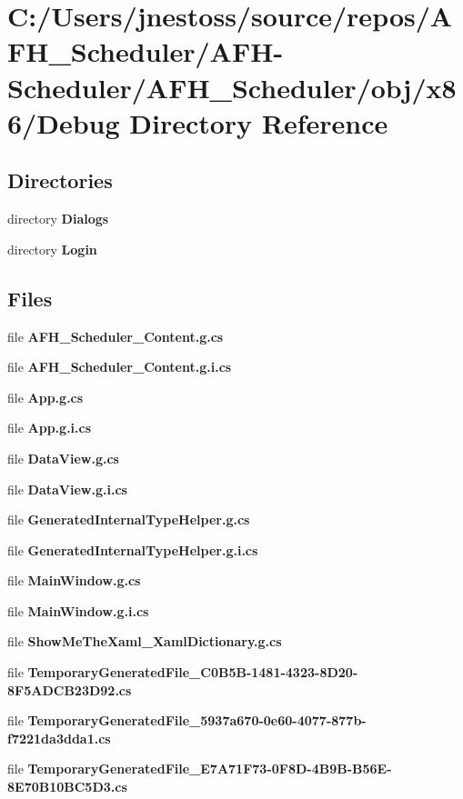 \section{C\+:/\+Users/jnestoss/source/repos/\+A\+F\+H\+\_\+\+Scheduler/\+A\+F\+H-\/\+Scheduler/\+A\+F\+H\+\_\+\+Scheduler/obj/x86/\+Debug Directory Reference}
\label{dir_adbf8bd868766d99b41dc5a8aa43c2f5}
\subsection*{Directories}
\begin{DoxyCompactItemize}
\item 
directory \textbf{ Dialogs}
\item 
directory \textbf{ Login}
\end{DoxyCompactItemize}
\subsection*{Files}
\begin{DoxyCompactItemize}
\item 
file \textbf{ A\+F\+H\+\_\+\+Scheduler\+\_\+\+Content.\+g.\+cs}
\item 
file \textbf{ A\+F\+H\+\_\+\+Scheduler\+\_\+\+Content.\+g.\+i.\+cs}
\item 
file \textbf{ App.\+g.\+cs}
\item 
file \textbf{ App.\+g.\+i.\+cs}
\item 
file \textbf{ Data\+View.\+g.\+cs}
\item 
file \textbf{ Data\+View.\+g.\+i.\+cs}
\item 
file \textbf{ Generated\+Internal\+Type\+Helper.\+g.\+cs}
\item 
file \textbf{ Generated\+Internal\+Type\+Helper.\+g.\+i.\+cs}
\item 
file \textbf{ Main\+Window.\+g.\+cs}
\item 
file \textbf{ Main\+Window.\+g.\+i.\+cs}
\item 
file \textbf{ Show\+Me\+The\+Xaml\+\_\+\+Xaml\+Dictionary.\+g.\+cs}
\item 
file \textbf{ Temporary\+Generated\+File\+\_\+C0\+B5\+B-\/1481-\/4323-\/8\+D20-\/8\+F5\+A\+D\+C\+B23\+D92.\+cs}
\item 
file \textbf{ Temporary\+Generated\+File\+\_\+5937a670-\/0e60-\/4077-\/877b-\/f7221da3dda1.\+cs}
\item 
file \textbf{ Temporary\+Generated\+File\+\_\+\+E7\+A71\+F73-\/0\+F8\+D-\/4\+B9\+B-\/\+B56\+E-\/8\+E70\+B10\+B\+C5\+D3.\+cs}
\end{DoxyCompactItemize}

